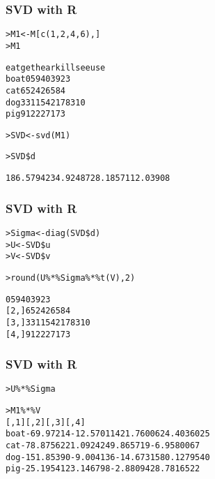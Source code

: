 \begin{frame}[fragile]
  \frametitle{SVD with R}

\ungap
\begin{alltt}\small 
{}
> M1 <- M[c(1, 2, 4, 6), ]
> M1 \begin{Rout}       
        eat get hear kill see use
  boat    0  59    4    0  39  23
  cat     6  52    4   26  58   4
  dog    33 115   42   17  83  10
  pig     9  12    2   27  17   3 \end{Rout}

> SVD <- svd(M1)

> SVD\$d   \begin{Rout}
[1] 186.57942  34.92487  28.18571  12.03908  \end{Rout}
\end{alltt}
\end{frame}

\begin{frame}[fragile]
  \frametitle{SVD with R}

\ungap
\begin{alltt}\small
{}
> Sigma <- diag(SVD\$d)  
> U <- SVD\$u  
> V <- SVD\$v  

> round(U \%*\% Sigma \%*\% t(V), 2) \begin{Rout}
     [,1] [,2] [,3] [,4] [,5] [,6]
[1,]    0   59    4    0   39   23
[2,]    6   52    4   26   58    4
[3,]   33  115   42   17   83   10
[4,]    9   12    2   27   17    3 \end{Rout}

\end{alltt}
\end{frame}


\begin{frame}[fragile]
  \frametitle{SVD with R}

\ungap
\begin{alltt}\small
{}
> U \%*\% Sigma

> M1 \%*\% V  
             [,1]       [,2]       [,3]       [,4]
  boat  -69.97214 -12.570114  21.760062  4.4036025
  cat   -78.87562  21.092424   9.865719 -6.9580067
  dog  -151.85390  -9.004136 -14.673158  0.1279540
  pig   -25.19541  23.146798  -2.880942  8.7816522
\end{alltt}
\end{frame}


